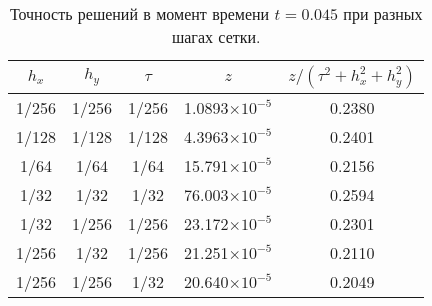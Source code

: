 \documentclass[a4paper,12pt]{article}
\begin{document}
\begin{table}
	\centering
	\caption{Точность решений в момент времени $t=0.045$ при разных шагах сетки.}
	\begin{tabular}{| c c c | c | c |}
		\hline
		$h_x$ & $h_y$ & $\tau$ & $z$ & $z/(\tau^2+h_x^2+h_y^2)$\\
		\hline
		1/256 & 1/256 & 1/256 & 1.0893$\times10^{-5}$ & 0.2380\\
		1/128 & 1/128 & 1/128 & 4.3963$\times10^{-5}$ & 0.2401\\
		1/64 & 1/64 & 1/64 & 15.791$\times10^{-5}$ & 0.2156\\
		1/32 & 1/32 & 1/32 & 76.003$\times10^{-5}$ & 0.2594\\
		1/32 & 1/256 & 1/256 & 23.172$\times10^{-5}$& 0.2301\\
		1/256 & 1/32 & 1/256 & 21.251$\times10^{-5}$ & 0.2110\\
		1/256 & 1/256 & 1/32 & 20.640$\times10^{-5}$ & 0.2049\\
		\hline
	\end{tabular}
	\label{tab:precision-new}
\end{table}
\end{document}
